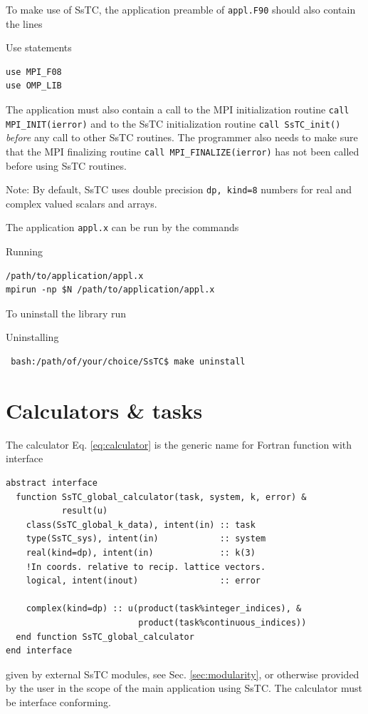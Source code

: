 \documentclass[10pt,a4paper]{article}
\begin{document}
To make use of SsTC, the application preamble of \verb|appl.F90| should also contain the lines
\begin{codebox}{Use statements}
\begin{verbatim}
use MPI_F08
use OMP_LIB
\end{verbatim}
\end{codebox}
The application must also contain a call to the MPI \cite{messagepassinginterfaceforumMPIMessagePassingInterface2021} initialization routine \verb|call MPI_INIT(ierror)| and to the SsTC initialization routine \verb|call SsTC_init()| \textit{before} any call to other SsTC routines. The programmer also needs to make sure that the MPI finalizing routine \verb|call MPI_FINALIZE(ierror)| has not been called before using SsTC routines.

Note:  By default, SsTC uses double precision \verb|dp, kind=8| numbers for real and complex valued scalars and arrays.

The application \verb|appl.x| can be run by the commands
\begin{codebox}{Running}
\begin{verbatim}
/path/to/application/appl.x
mpirun -np $N /path/to/application/appl.x
\end{verbatim}
\end{codebox}

To uninstall the library run
\begin{codebox}{Uninstalling}
\begin{verbatim}
 bash:/path/of/your/choice/SsTC$ make uninstall
\end{verbatim}
\end{codebox}
\section{Calculators \& tasks}
The calculator Eq. \eqref{eq:calculator} is the generic name for Fortran function with interface
\begin{codebox}{}
\begin{lstlisting}[caption={Interface of a global calculator.},captionpos=b, label={lst:interface_g_calc}]
abstract interface
  function SsTC_global_calculator(task, system, k, error) &
           result(u)
    class(SsTC_global_k_data), intent(in) :: task
    type(SsTC_sys), intent(in)            :: system
    real(kind=dp), intent(in)             :: k(3)
    !In coords. relative to recip. lattice vectors.
    logical, intent(inout)                :: error

    complex(kind=dp) :: u(product(task%integer_indices), &
                          product(task%continuous_indices))
  end function SsTC_global_calculator
end interface
\end{lstlisting}
\end{codebox}
given by external SsTC modules, see Sec. \ref{sec:modularity}, or otherwise provided by the user in the scope of the main application using SsTC. The calculator must be interface conforming.
\end{document}
